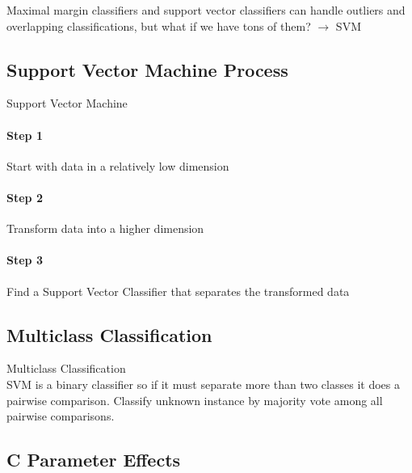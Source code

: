 \begin{remark}
Maximal margin classifiers and support vector classifiers can handle outliers and overlapping classifications, but what if we have tons of them? $\rightarrow$ SVM
\end{remark}

\subsection{Support Vector Machine Process}

\begin{KR}{Support Vector Machine}\\
\paragraph{Step 1}
Start with data in a relatively low dimension

\paragraph{Step 2}
Transform data into a higher dimension

\paragraph{Step 3}
Find a Support Vector Classifier that separates the transformed data
\end{KR}


\subsection{Multiclass Classification}

\begin{concept}{Multiclass Classification}\\
SVM is a binary classifier so if it must separate more than two classes it does a pairwise comparison. Classify unknown instance by majority vote among all pairwise comparisons.
\end{concept}


\subsection{C Parameter Effects}

